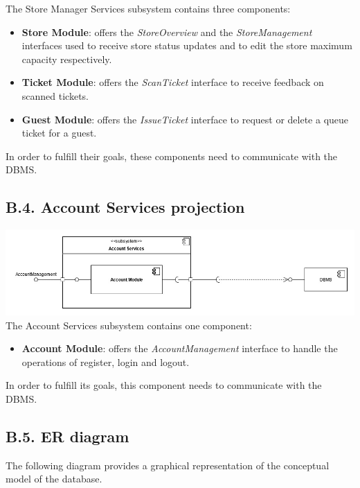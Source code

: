The Store Manager Services subsystem contains three components:
\begin{itemize}
\item
    \textbf{Store Module}: offers the \emph{StoreOverview} and the \emph{StoreManagement} interfaces used to receive store status updates and to edit the store maximum capacity respectively.
\item
    \textbf{Ticket Module}: offers the \emph{ScanTicket} interface to receive feedback on scanned tickets.
\item
    \textbf{Guest Module}: offers the \emph{IssueTicket} interface to request or delete a queue ticket for a guest.
\end{itemize}

In order to fulfill their goals, these components need to communicate with the DBMS.

\clearpage
\subsection{B.4. Account Services projection}

\includegraphics{components_view/account_services_projection}
The Account Services subsystem contains one component:
\begin{itemize}
\item
    \textbf{Account Module}: offers the \emph{AccountManagement} interface to handle the operations of register, login and logout.
\end{itemize}

In order to fulfill its goals, this component needs to communicate with the DBMS.

\subsection{B.5. ER diagram}

The following diagram provides a graphical representation of the conceptual model of the database.

